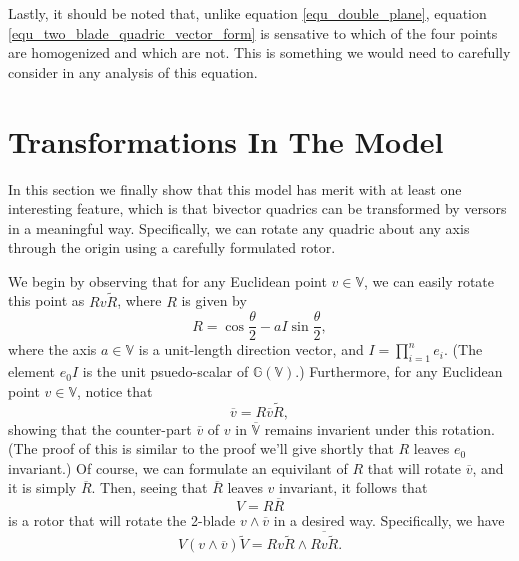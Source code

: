 \documentclass{birkjour}
\theoremstyle{definition}
\theoremstyle{remark}
\numberwithin{equation}{section}
\newcommand{\G}{\mathbb{G}}
\newcommand{\V}{\mathbb{V}}
\begin{document}
Lastly, it should be noted that, unlike equation \eqref{equ_double_plane},
equation \eqref{equ_two_blade_quadric_vector_form} is sensative to which
of the four points are homogenized and which are not.  This is something
we would need to carefully consider in any analysis of this equation.

\section{Transformations In The Model}

In this section we finally show that this model has merit with at least one
interesting feature, which is that bivector quadrics can be transformed by
versors in a meaningful way.  Specifically, we can rotate any quadric about
any axis through the origin using a carefully formulated rotor.

We begin by observing that for any Euclidean point $v\in\V$,
we can easily rotate this point as $Rv\tilde{R}$, where $R$ is
given by
\begin{equation}
R = \cos\frac{\theta}{2} - aI\sin\frac{\theta}{2},
\end{equation}
where the axis $a\in\V$ is a unit-length direction vector, and $I=\prod_{i=1}^n e_i$.
(The element $e_0I$ is the unit psuedo-scalar of $\G(\V)$.)
Furthermore, for any Euclidean point $v\in\V$, notice that
\begin{equation}
\overline{v} = R\overline{v}\tilde{R},
\end{equation}
showing that the counter-part $\overline{v}$ of $v$ in $\overline{\V}$ remains invarient
under this rotation.  (The proof of this is similar to the proof we'll give
shortly that $R$ leaves $e_0$ invariant.)  Of course, we can formulate an equivilant of $R$
that will rotate $\overline{v}$, and it is simply $\overline{R}$.  Then, seeing
that $\overline{R}$ leaves $v$ invariant, it follows that
\begin{equation}\label{equ_rotation_versor}
V=R\overline{R}
\end{equation}
is a rotor that will rotate the 2-blade
$v\wedge\overline{v}$ in a desired way.  Specifically, we have
\begin{equation}
V(v\wedge\overline{v})\tilde{V} = Rv\tilde{R}\wedge\overline{Rv\tilde{R}}.
\end{equation}
\end{document}
